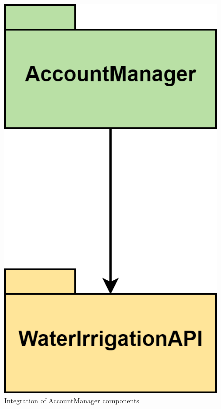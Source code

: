 \documentclass[table, 12pt]{article}
\begin{document}
\begin{figure}[H]
    \centering
    \includegraphics[scale=0.5, center]{assets/Test/accountTest.png}
    \caption{Integration of AccountManager components}
    \label{fig: integration_AccountManager}
\end{figure}
\end{document}
